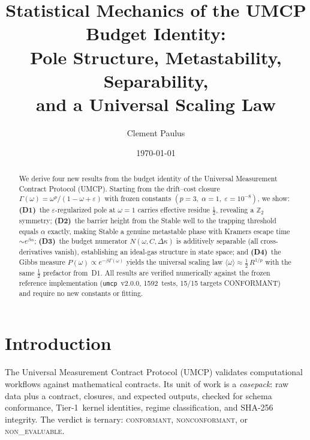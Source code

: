\documentclass[
  aps,
  prd,
  twocolumn,
  showpacs,
  superscriptaddress,
  nofootinbib,
  floatfix
]{revtex4-2}
\newcommand{\Gam}{\Gamma}
\newcommand{\eps}{\varepsilon}
\begin{document}
\title{Statistical Mechanics of the UMCP Budget Identity:\\
Pole Structure, Metastability, Separability,\\
and a Universal Scaling Law}

\author{Clement Paulus}

\date{\today}

\begin{abstract}
We derive four new results from the budget identity of the
Universal Measurement Contract Protocol (UMCP).  Starting
from the drift--cost closure $\Gam(\omega)=\omega^{p}/(1-\omega+\eps)$
with frozen constants $(p{=}3,\;\alpha{=}1,\;\eps{=}10^{-8})$, we show:
\textbf{(D1)}~the $\eps$-regularized pole at $\omega{=}1$ carries effective
residue $\tfrac{1}{2}$, revealing a $\mathbb{Z}_2$ symmetry;
\textbf{(D2)}~the barrier height from the Stable well to the trapping
threshold equals $\alpha$ exactly, making Stable a genuine metastable
phase with Kramers escape time $\sim e^{\beta\alpha}$;
\textbf{(D3)}~the budget numerator $N(\omega,C,\Delta\kappa)$ is
additively separable (all cross-derivatives vanish), establishing an
ideal-gas structure in state space; and
\textbf{(D4)}~the Gibbs measure $P(\omega)\propto e^{-\beta\Gam(\omega)}$
yields the universal scaling law
$\langle\omega\rangle\approx\tfrac{1}{2}\,R^{1/p}$
with the same $\tfrac{1}{2}$ prefactor from~D1.
All results are verified numerically against the frozen reference
implementation (\texttt{umcp}~v2.0.0, 1592~tests, 15/15 targets
CONFORMANT) and require no new constants or fitting.
\end{abstract}

\maketitle

\section{Introduction}\label{sec:intro}

The Universal Measurement Contract Protocol (UMCP)
\cite{paulus2025umcp,paulus2025physicscoherence}
validates computational workflows against mathematical contracts.
Its unit of work is a \emph{casepack}: raw data plus a contract,
closures, and expected outputs, checked for schema conformance,
Tier-1~kernel identities, regime classification, and SHA-256
integrity.  The verdict is ternary:
\textsc{conformant}, \textsc{nonconformant}, or
\textsc{non\_evaluable}.
\end{document}
